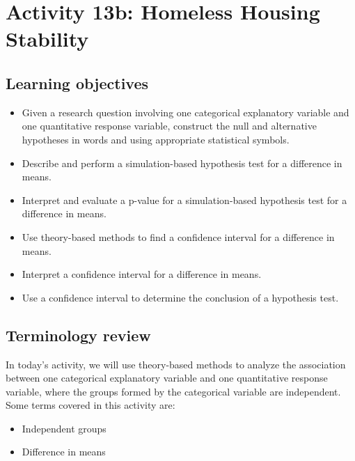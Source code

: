 \documentclass[
]{report}
\begin{document}
\newpage

\hypertarget{activity-13b-homeless-housing-stability}{%
\section{Activity 13b: Homeless Housing Stability}\label{activity-13b-homeless-housing-stability}}


\hypertarget{learning-objectives-20}{%
\subsection{Learning objectives}\label{learning-objectives-20}}

\begin{itemize}
\item
  Given a research question involving one categorical explanatory variable and one quantitative response variable, construct the null and alternative hypotheses
  in words and using appropriate statistical symbols.
\item
  Describe and perform a simulation-based hypothesis test for a difference in means.
\item
  Interpret and evaluate a p-value for a simulation-based hypothesis test for a difference in means.
\item
  Use theory-based methods to find a confidence interval for a difference in means.
\item
  Interpret a confidence interval for a difference in means.
\item
  Use a confidence interval to determine the conclusion of a hypothesis test.
\end{itemize}

\hypertarget{terminology-review-22}{%
\subsection{Terminology review}\label{terminology-review-22}}

In today's activity, we will use theory-based methods to analyze the association between one categorical explanatory variable and one quantitative response variable, where the groups formed by the categorical variable are independent. Some terms covered in this activity are:

\begin{itemize}
\item
  Independent groups
\item
  Difference in means
\end{itemize}
\end{document}
